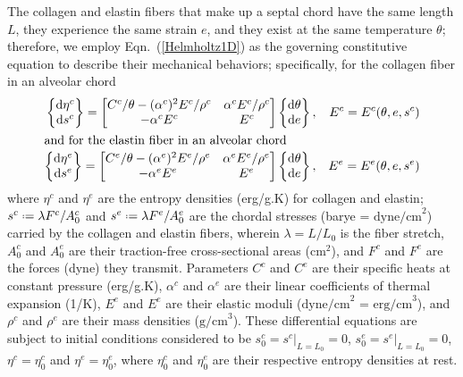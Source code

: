 The collagen and elastin fibers that make up a septal chord have the same length $L$, they experience the same strain $e$, and they exist at the same temperature $\theta$; therefore, we employ Eqn.~(\ref{Helmholtz1D}) as the governing constitutive equation to describe their mechanical behaviors; specifically, for the collagen fiber in an alveolar chord
\begin{subequations}
    \label{alveolarChord}
    \begin{align}
    \left\{ \begin{matrix} 
    \mathrm{d} \eta^c \\ \mathrm{d} s^c
    \end{matrix} \right\} = \begin{bmatrix}
    C^c / \theta - ( \alpha^c )^2 E^c / \rho^c & \alpha^c E^c / \rho^c \\
    -\alpha^c E^c & E^c
    \end{bmatrix} \left\{ \begin{matrix}
    \mathrm{d} \theta \\ \mathrm{d} e
    \end{matrix} \right\} , & & 
    E^c = E^c ( \theta , e , s^c ) \\
    \intertext{and for the elastin fiber in an alveolar chord}
    \left\{ \begin{matrix} 
    \mathrm{d} \eta^e \\ \mathrm{d} s^e
    \end{matrix} \right\} = \begin{bmatrix}
    C^e / \theta - ( \alpha^e )^2 E^e / \rho^e & \alpha^e E^e / \rho^e \\
    -\alpha^e E^e & E^e
    \end{bmatrix} \left\{ \begin{matrix}
    \mathrm{d} \theta \\ \mathrm{d} e
    \end{matrix} \right\} , & &
    E^e = E^e ( \theta , e , s^e )
    \end{align}
\end{subequations}
where $\eta^c$ and $\eta^e$ are the entropy densities (erg/g.K) for collagen and elastin; $s^c \defeq \lambda F^c / A^c_0$ and $s^e \defeq \lambda F^e / A_0^e$ are the chordal stresses (barye = $\text{dyne/cm}^2$) carried by the collagen and elastin fibers, wherein $\lambda = L/L_0$ is the fiber stretch, $A^c_0$ and $A^e_0$ are their traction-free cross-sectional areas ($\text{cm}^2$), and $F^c$ and $F^e$ are the forces (dyne) they transmit.  Parameters $C^c$ and $C^e$ are their specific heats at constant pressure (erg/g.K), $\alpha^c$ and $\alpha^e$ are their linear coefficients of thermal expansion (1/K), $E^e$ and $E^e$ are their elastic moduli ($\text{dyne/cm}^2$ = $\text{erg/cm}^3$), and $\rho^c$ and $\rho^e$ are their mass densities ($\text{g/cm}^3$).  These differential equations are subject to initial conditions considered to be $s^c_0 = s^c |_{L = L_0} = 0$, $s^e_0 = s^e |_{L = L_0} = 0$, $\eta^c = \eta^c_0$ and $\eta^e = \eta^e_0$, where  $\eta_0^c$ and $\eta_0^e$ are their respective entropy densities at rest.

